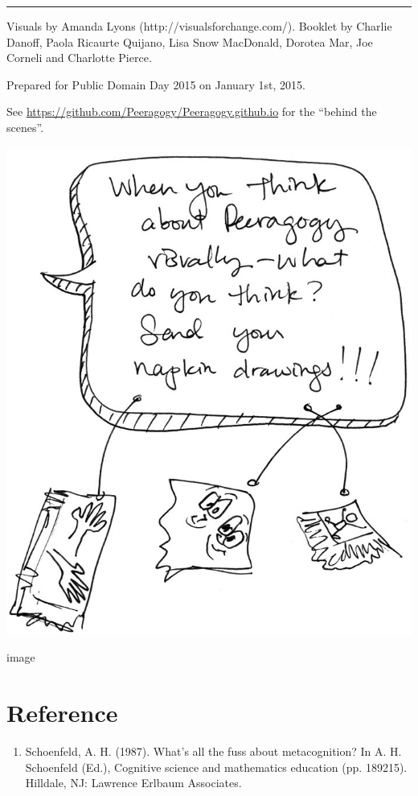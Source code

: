 \begin{center}\rule{0.5\linewidth}{\linethickness}\end{center}

Visuals by Amanda Lyons (http://visualsforchange.com/). Booklet by
Charlie Danoff, Paola Ricaurte Quijano, Lisa Snow MacDonald, Dorotea
Mar, Joe Corneli and Charlotte Pierce.

Prepared for Public Domain Day 2015 on January 1st, 2015.

See \url{https://github.com/Peeragogy/Peeragogy.github.io} for the
``behind the scenes''.

\includegraphics{../pictures/napkin-drawings.jpg}

image

\section{Reference}\label{reference}

\begin{enumerate}
\def\labelenumi{\arabic{enumi}.}
\tightlist
\item
  Schoenfeld, A. H. (1987). What's all the fuss about metacognition? In
  A. H. Schoenfeld (Ed.), Cognitive science and mathematics education
  (pp. 189­215). Hilldale, NJ: Lawrence Erlbaum Associates.
\end{enumerate}

